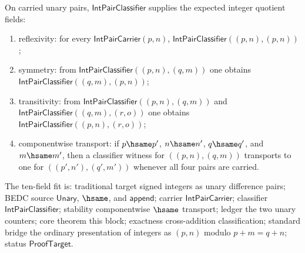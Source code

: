 \begin{theorem}
\label{thm:intup-difference-pair-classifier-equivalence-fields}
On carried unary pairs, $\mathsf{IntPairClassifier}$ supplies the expected
integer quotient fields:
\begin{enumerate}
\item reflexivity:
for every $\mathsf{IntPairCarrier}(p,n)$,
$\mathsf{IntPairClassifier}((p,n),(p,n))$;
\item symmetry:
from $\mathsf{IntPairClassifier}((p,n),(q,m))$ one obtains
$\mathsf{IntPairClassifier}((q,m),(p,n))$;
\item transitivity:
from $\mathsf{IntPairClassifier}((p,n),(q,m))$ and
$\mathsf{IntPairClassifier}((q,m),(r,o))$ one obtains
$\mathsf{IntPairClassifier}((p,n),(r,o))$;
\item componentwise transport:
if $p\hsame p'$, $n\hsame n'$, $q\hsame q'$, and $m\hsame m'$, then a
classifier witness for $((p,n),(q,m))$ transports to one for
$( (p',n'),(q',m') )$ whenever all four pairs are carried.
\end{enumerate}
The ten-field fit is: traditional target signed integers as unary difference
pairs; BEDC source $\mathsf{Unary}$, $\hsame$, and $\mathsf{append}$;
carrier $\mathsf{IntPairCarrier}$; classifier
$\mathsf{IntPairClassifier}$; stability componentwise $\hsame$ transport;
ledger the two unary counters; core theorem this block; exactness
cross-addition classification; standard bridge the ordinary presentation of
integers as $(p,n)$ modulo $p+m=q+n$; status $\mathsf{ProofTarget}$.
\end{theorem}
